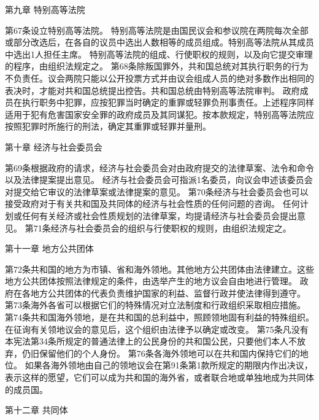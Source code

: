                           第九章    特别高等法院
 
    第67条设立特别高等法院。
    特别高等法院是由国民议会和参议院在两院每次全部或部分改选后，在各自的议员中选出人数相等的成员组成。特别高等法院从其成员中选出1人担任主席。
    特别高等法院的组成、行使职权的规则，以及向它提交审理的程序，由组织法规定之。
    第68条除叛国罪外，共和国总统对其执行职务的行为不负责任。议会两院只能以公开投票方式并由议会组成人员的绝对多数作出相同的表决时，才能对共和国总统提出控告。共和国总统由特别高等法院审判。
    政府成员在执行职务中犯罪，应按犯罪当时确定的重罪或轻罪负刑事责任。上述程序同样适用于犯有危害国家安全罪的政府成员及其同谋犯。按本款规定，特别高等法院应按照犯罪时所施行的刑法，确定其重罪或轻罪并量刑。
                      
                         第十章    经济与社会委员会
 
    第69条根据政府的请求，经济与社会委员会对由政府提交的法律草案、法令和命令以及法律提案提出意见。
    经济与社会委员会可指派1名委员，向议会申述该委员会对提交给它审议的法律草案或法律提案的意见。
    第70条经济与社会委员会也可以接受政府对于有关共和国及共同体的经济与社会性质的任何问题的咨询。
    任何计划或任何有关经济或社会性质规划的法律草案，均提请经济与社会委员会提出意见。
    第71条经济与社会委员会的组织与行使职权的规则，由组织法规定之。
 
                         第十一章    地方公共团体
 
    第72条共和国的地方为市镇、省和海外领地。其他地方公共团体由法律建立。这些地方公共团体按照法律规定的条件，由选举产生的地方议会自由地进行管理。
    政府在各地方公共团体的代表负责维护国家的利益、监督行政并使法律得到遵守。
    第73条海外各省可以根据它们的特殊情况对立法制度和行政组织采取相应措施。
    第74条共和国海外领地，是在共和国的总利益中，照顾领地固有利益的特殊组织。在征询有关领地议会的意见后，这个组织由法律予以确定或改变。
    第75条凡没有本宪法第34条所规定的普通法律上的公民身份的共和国公民，只要他们本人不放弃，仍旧保留他们的个人身份。
    第76条各海外领地可以在共和国内保持它们的地位。
    如果各海外领地由自己的领地议会在第91条第1款所规定的期限内作出决议，表示这样的愿望，它们可以成为共和国的海外省，或者联合地或单独地成为共同体的成员国。
                        
                           第十二章    共同体
 
